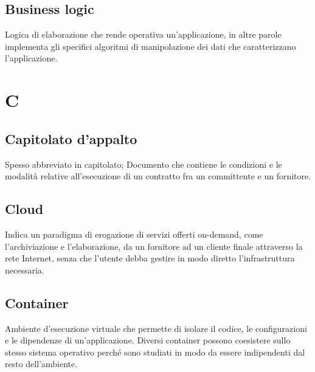 \subsection*{Business logic}
Logica di elaborazione che rende operativa un'applicazione, in altre parole implementa gli specifici algoritmi di manipolazione dei dati che caratterizzano l’applicazione.
\clearpage
\section*{C}

\subsection*{Capitolato d'appalto}
Spesso abbreviato in capitolato; Documento che contiene le condizioni e le modalità relative all'esecuzione di un contratto fra un committente e un fornitore.


\subsection*{Cloud}
Indica un paradigma di erogazione di servizi offerti on-demand, come l'archiviazione e l'elaborazione, da un fornitore ad un cliente finale attraverso la rete Internet, senza che l'utente debba gestire in modo diretto l'infrastruttura necessaria.

\subsection*{Container}
Ambiente d'esecuzione virtuale che permette di isolare il codice, le configurazioni e le dipendenze di un'applicazione. Diversi container possono coesistere sullo stesso sistema operativo perché sono studiati in modo da essere indipendenti dal resto dell'ambiente.


